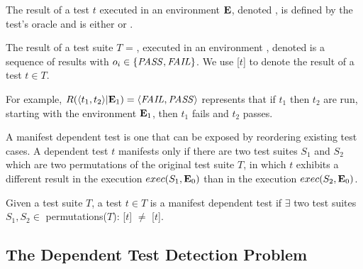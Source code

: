 \begin{definition}
The result of a test $t$ executed in an environment\/ $\mathbf{E}$,
denoted\/ , is defined by the test's oracle
and is either \pass or \fail.

The result of a test suite\/ $T$ = , executed in an
environment\/ \env, denoted\/  is a
sequence of results\/  with $o_i \in \{\mathit{PASS},\mathit{FAIL}\}$.
We use [$t$] to denote the result of a test $t \in T$.


For example, $R( \langle t_1, t_2 \rangle |\mathbf{E}_1) =  \langle \mathit{FAIL}, \mathit{PASS} \rangle $ represents that if
$t_1$ then $t_2$ are run, starting with the environment\/ $\mathbf{E}_1$, then\/
$t_1$ fails and\/ $t_2$ passes.
\end{definition}

A manifest dependent test is one that can be exposed by 
reordering existing test cases.
A dependent test $t$ manifests only
if there are two test suites $S_1$ and $S_2$ which
are two permutations of the original test suite $T$,
in which $t$ exhibits a different result
in the execution $exec(S_1,\mathbf{E}_0)$
than in the execution $exec(S_2,\mathbf{E}_0)$.

\begin{definition} \label{def:manifest}
Given a test suite\/ $T$, a test $t \in T$ is a
manifest dependent test if $\exists$ two test suites
$S_1, S_2 \in$ permutations($T$):
[$t$] $\neq$
[$t$].
%
\end{definition}




\subsection{The Dependent Test Detection Problem}

